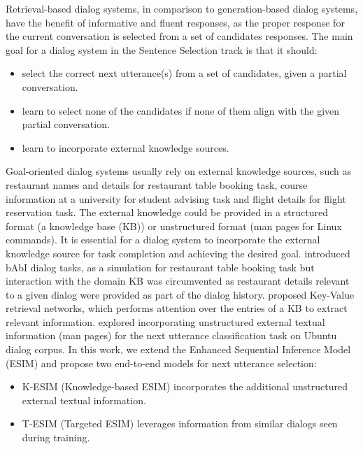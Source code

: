\documentclass[letterpaper]{article} %
\begin{document}
Retrieval-based dialog systems, in comparison to generation-based dialog systems, have the benefit of informative and fluent responses, as the proper response for the current conversation is selected from a set of candidates responses. The main goal for a dialog system in the Sentence Selection track is that it should:
\begin{itemize}
\item select the correct next utterance(s) from a set of candidates, given a partial conversation.
\item learn to select none of the candidates if none of them align with the given partial conversation.
\item learn to incorporate external knowledge sources.
\end{itemize}

Goal-oriented dialog systems usually rely on external knowledge sources, such as restaurant names and details for restaurant table booking task, course information at a university for student advising task and flight details for flight reservation task. The external knowledge could be provided in a structured format (a knowledge base (KB)) or unstructured format (man pages for Linux commands). It is essential for a dialog system to incorporate the external knowledge source for task completion and achieving the desired goal. \citeauthor{bordes2016learning}  introduced bAbI dialog tasks, as a simulation for restaurant table booking task but interaction with the domain KB was circumvented as restaurant details relevant to a given dialog were provided as part of the dialog history. \citeauthor{eric2017key}  proposed Key-Value retrieval networks, which performs attention over the entries of a KB to extract relevant information. \citeauthor{lowe2015incorporating}  explored incorporating unstructured external textual information (man pages) for the next utterance classification task on Ubuntu dialog corpus. In this work, we extend the Enhanced Sequential Inference Model (ESIM) \cite{chen2017enhanced} and propose two end-to-end models for next utterance selection:

\begin{itemize}
\item K-ESIM (Knowledge-based ESIM) incorporates the additional unstructured external textual information.
\item T-ESIM (Targeted ESIM) leverages information from similar dialogs seen during training.
\end{itemize}
\end{document}
